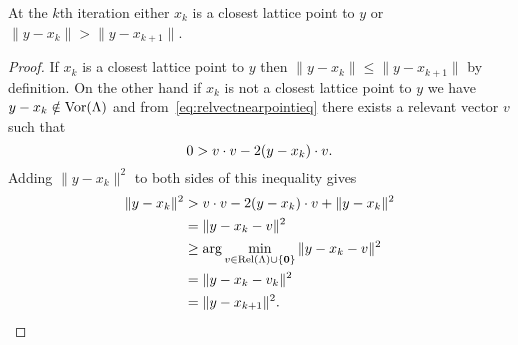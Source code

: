 \documentclass[final,leqno]{siamltex}
\begin{document}
\begin{proposition}\label{obs:1}
At the $k$th iteration either $x_k$ is a closest lattice point to $y$ or $\|y - x_k\| > \| y - x_{k+1} \|$.
\end{proposition}
\begin{proof}
If $x_k$ is a closest lattice point to $y$ then $\|y - x_k\| \leq \| y - x_{k+1} \|$ by definition.  On the other hand if $x_k$ is not a closest lattice point to $y$ we have $y - x_k \notin \operatorname{Vor}(\Lambda)$ and from~\eqref{eq:relvectnearpointieq} there exists a relevant vector $v$ such that
\[
0 > v \cdot v - 2(y - x_k) \cdot v.
\]
Adding $\|y - x_k\|^2$ to both sides of this inequality gives
\begin{align*}
\|y - x_k\|^2 &> v \cdot v - 2(y - x_k) \cdot v + \|y - x_k\|^2 \\
&= \|y - x_k - v\|^2 \\
&\geq \arg\min_{ v \in \operatorname{Rel}(\Lambda) \cup \{\boldsymbol{0}\}}\|y - x_k - v \|^2 \\
&= \|y - x_k - v_k \|^2 \\
&= \|y - x_{k+1}\|^2. 
\end{align*}
\end{proof} 

\end{document}
